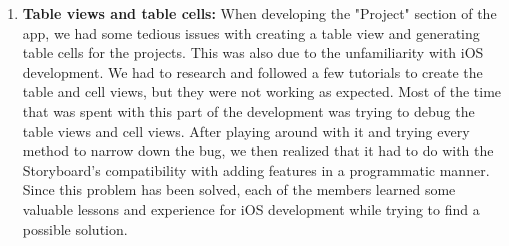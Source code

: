 \documentclass[onecolumn, draftclsnofoot,10pt, compsoc]{IEEEtran}
\begin{document}
\begin{enumerate}
  \item\textbf{Table views and table cells:}\newline
  When developing the "Project" section of the app, we had some tedious issues with creating a table view and generating table cells for the projects. This was also due to the unfamiliarity with iOS development. We had to research and followed a few tutorials to create the table and cell views, but they were not working as expected. Most of the time that was spent with this part of the development was trying to debug the table views and cell views. After playing around with it and trying every method to narrow down the bug, we then realized that it had to do with the Storyboard's compatibility with adding features in a programmatic manner. Since this problem has been solved, each of the members learned some valuable lessons and experience for iOS development while trying to find a possible solution. \newline
  
\end{enumerate}
\end{document}
